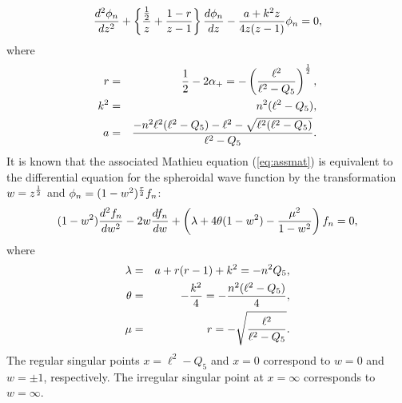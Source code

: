 \documentclass[a4paper,12pt]{article}
\begin{document}
\begin{equation}
 {d^2\phi_{n}\over dz^2}+
\left\{
{{1\over2}\over z}+{1-r\over z-1}
\right\}{d\phi_{n}\over dz}
-{a+k^2 z\over 4z(z-1)}\phi_{n}=0,
\label{eq:assmat}
\end{equation}
where
\begin{eqnarray}
r&=& {1\over2}-2\alpha_{+}
=- \left({\ell^2\over \ell^2-Q_{5}}\right)^{1\over2},
\nonumber\\
k^2&=& n^2(\ell^2-Q_{5}),\\
a&=&{-n^2\ell^2(\ell^2-Q_{5})-\ell^2-\sqrt{\ell^2(\ell^2-Q_{5})}\over
 \ell^2-Q_{5}}.
\end{eqnarray}
It is known that the associated Mathieu equation (\ref{eq:assmat}) 
is equivalent to  the
differential equation for the spheroidal wave function 
\cite{Er} by the 
transformation $w=z^{1\over2}$ and $\phi_{n}= (1-w^2)^{r\over2} f_{n}$:
\begin{equation}
(1-w^2) {d^2f_{n}\over dw^2}-2w{df_{n}\over dw}+\left(\lambda+4\theta (1-w^2)
-{\mu^2\over 1-w^2}\right)f_{n}=0,
\label{eq:sphe}
\end{equation}
where
\begin{eqnarray}
\lambda&=& a+r(r-1)+k^2=-n^2Q_{5},\nonumber\\
 \theta&=& -{k^2\over 4}=-{n^2(\ell^2-Q_{5})\over 4},\nonumber\\
 \mu&=& r=-\sqrt{\ell^2\over \ell^2-Q_{5}}.
\end{eqnarray}
The regular singular points $x=\ell^2-Q_{5}$ and $x=0$ correspond to $w=0$
and $w=\pm 1$, respectively.
The irregular singular point at $x=\infty$ corresponds to $w=\infty$.
\end{document}
